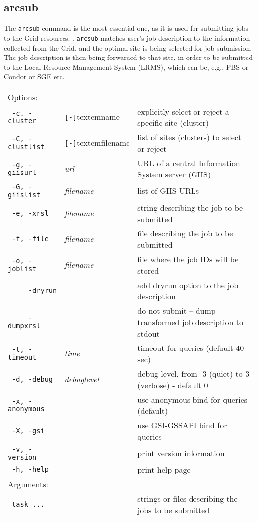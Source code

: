 \subsection{arcsub}\label{sec:arcsub}
The \texttt{arcsub} command is the
most essential one, as it is used for submitting jobs to the Grid
resources. . \texttt{arcsub} matches user's job
description to the information collected from the Grid, and the
optimal site is being selected for job submission. The job description
is then being forwarded to that site, in order to be submitted to the
Local Resource Management System (LRMS), which can be, e.g., PBS or
Condor or SGE etc.

\hspace*{0.5cm}
\begin{shaded}
\end{shaded}
\begin{longtable}{llp{8cm}}
   Options:&&\\
   \texttt{ -c, -cluster}&\verb#[-]#textem{name}&explicitly select or reject a specific site (cluster)\\
   \texttt{ -C, -clustlist}&\verb#[-]#textem{filename}&list of sites (clusters) to select or reject\\
   \texttt{ -g, -giisurl}&\textit{url}&URL of a central Information System server (GIIS)\\
   \texttt{ -G, -giislist}&\textit{filename}&list of GIIS URLs\\
   \texttt{ -e, -xrsl}&\textit{filename}&string describing the job to be submitted\\
   \texttt{ -f, -file}&\textit{filename}&file describing the job to be submitted\\
   \texttt{ -o, -joblist}&\textit{filename}&file where the job IDs will be stored\\
   \texttt{ ~~~~-dryrun}&&add dryrun option to the job description\\
   \texttt{ ~~~~-dumpxrsl}&&do not submit -- dump transformed job description to stdout\\
   \texttt{ -t, -timeout}&\textit{time}&timeout for queries (default 40 sec)\\
   \texttt{ -d, -debug}&\textit{debuglevel}&debug level, from -3 (quiet) to 3 (verbose) - default 0\\
   \texttt{ -x, -anonymous}&&use anonymous bind for queries (default)\\
   \texttt{ -X, -gsi}&&use GSI-GSSAPI bind for queries\\
   \texttt{ -v, -version}&&print version information\\
   \texttt{ -h, -help}&&print help page\\
   Arguments:&&\\
   \texttt{ task ...}&&strings or files describing the jobs to be submitted\\
\end{longtable}

